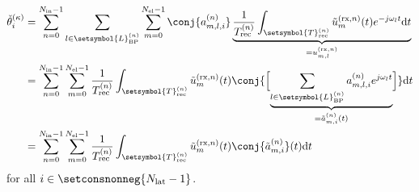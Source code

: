 \begin{equation}
\begin{split}
  \check{\theta}_{i}^{(\kappa)}
  &=
  \sum_{ n = 0 }^{ N_{\text{in}} - 1 }
    \sum_{ l \in \setsymbol{L}_{ \text{BP} }^{(n)} }
    \sum_{ m = 0 }^{ N_{\text{el}} - 1 }
      \conj{ a_{ m, l, i }^{(n)}{} }
      \underbrace{
        \frac{ 1 }{ T_{ \text{rec} }^{(n)} }
        \int_{ \setsymbol{T}_{ \text{rec} }^{(n)} }
          \tilde{u}_{m}^{(\text{rx}, n)}( t )
          e^{ -j \omega_{l} t }
        \text{d} t
      }_{ = u_{ m, l }^{(\text{rx}, n)} }\\
  &=
  \sum_{ n = 0 }^{ N_{\text{in}} - 1 }
    \sum_{ m = 0 }^{ N_{\text{el}} - 1 }
      \frac{ 1 }{ T_{ \text{rec} }^{(n)} }
      \int_{ \setsymbol{T}_{ \text{rec} }^{(n)} }
        \tilde{u}_{m}^{(\text{rx}, n)}( t )
        \conj{
          \Bigl[
            \underbrace{
              \sum_{ l \in \setsymbol{L}_{ \text{BP} }^{(n)} }
                a_{ m, l, i }^{(n)}
                e^{ j \omega_{l} t }
            }_{ = \tilde{a}_{ m, i }^{(n)}( t ) }
          \Bigr]
        }
      \text{d} t\\
  &=
  \sum_{ n = 0 }^{ N_{\text{in}} - 1 }
    \sum_{ m = 0 }^{ N_{\text{el}} - 1 }
      \frac{ 1 }{ T_{ \text{rec} }^{(n)} }
      \int_{ \setsymbol{T}_{ \text{rec} }^{(n)} }
        \tilde{u}_{m}^{(\text{rx}, n)}( t )
        \conj{ \tilde{a}_{ m, i }^{(n)}{} }( t )
      \text{d} t\\
\end{split}
\label{eqn:app_adjoint_xcorr_td}
\end{equation}
for
all $i \in \setconsnonneg{ N_{\text{lat}} - 1 }$.
